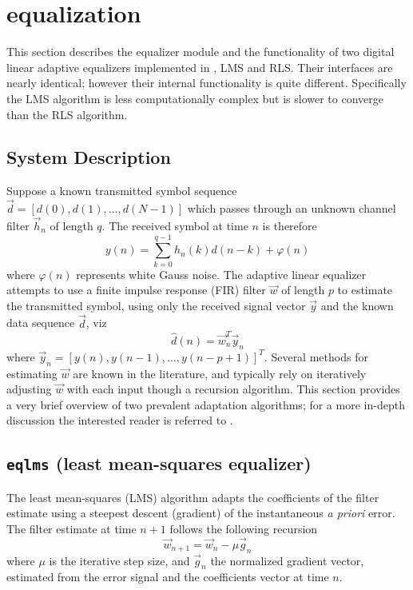 % 
%

\newpage
\section{equalization}
\label{module:equalization}
This section describes the equalizer module and the functionality of two
digital linear adaptive equalizers implemented in \liquid, LMS and RLS.
Their interfaces are nearly identical;
however their internal functionality is quite different.
Specifically the LMS algorithm is less computationally complex but is
slower to converge than the RLS algorithm.

\subsection{System Description}
\label{module:equalization:system}
Suppose a known transmitted symbol sequence
$\vec{d} = [ d(0), d(1), \ldots ,d(N-1) ]$
which passes through an unknown channel filter $\vec{h}_n$ of length
$q$.
The received symbol at time $n$ is therefore
%
\begin{equation}
    y(n) = \sum\limits_{k=0}^{q-1}{h_n(k)d(n-k)} + \varphi(n)
\end{equation}
%
where $\varphi(n)$ represents white Gauss noise.
The adaptive linear equalizer attempts to use a finite impulse response (FIR)
filter $\vec{w}$ of length $p$ to estimate the transmitted symbol, using only
the received signal vector $\vec{y}$ and the known data sequence $\vec{d}$,
viz
%
\begin{equation}
\label{eqn:equalization:dhat}
    \hat{d}(n) = \vec{w}_n^T \vec{y}_n
\end{equation}
%
where $\vec{y}_n = [ y(n), y(n-1),\ldots, y(n-p+1) ]^T$.
Several methods for estimating $\vec{w}$ are known in the literature, and
typically rely on iteratively adjusting $\vec{w}$ with each input though a
recursion algorithm.
This section provides a very brief overview of two prevalent adaptation
algorithms;
for a more in-depth discussion the interested reader is referred to
\cite{Proakis:2001,Haykin:2002}.

\subsection{{\tt eqlms} (least mean-squares equalizer)}
\label{module:equalization:eqlms}
The least mean-squares (LMS) algorithm adapts the coefficients of the filter
estimate using a steepest descent (gradient) of the instantaneous {\it a priori}
error.
The filter estimate at time $n+1$ follows the following recursion
%
\begin{equation}
\label{eqn:equalization:lms_update}
    \vec{w}_{n+1} = \vec{w}_{n} - \mu \vec{g}_n
\end{equation}
%
where $\mu$ is the iterative step size, and
$\vec{g}_n$ the normalized gradient vector, estimated from the error signal
and the coefficients vector at time $n$.


